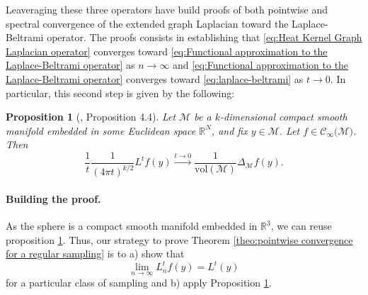 \documentclass{article} %
\newtheorem{definition}{Definition}[section]
\newtheorem{prop}{Proposition}
\renewcommand{\b}[1]{{\bm{#1}}}   %
\begin{document}
Leaveraging these three operators \cite{belkin2005towards, belkin2007convergence} have build proofs of both pointwise and spectral convergence of the extended graph Laplacian toward the Laplace-Beltrami operator.
The proofs consists in establishing that \eqref{eq:Heat Kernel Graph Laplacian operator} converges toward \eqref{eq:Functional approximation to the Laplace-Beltrami operator} as $n\rightarrow \infty$ and \eqref{eq:Functional approximation to the Laplace-Beltrami operator} converges toward \eqref{eq:laplace-beltrami} as $t\rightarrow 0$. In particular, this second step is given by the following:
\begin{prop}
[\cite{belkin2005towards}, Proposition 4.4]
Let $\mathcal{M}$ be a $k$-dimensional compact smooth manifold embedded in some Euclidean space $\mathbb{R}^N$, and fix $y\in\mathcal{M}$. Let $f\in\mathcal{C}_\infty(\mathcal{M)}$. Then
\begin{equation}
\frac{1}{t}\frac{1}{(4\pi t)^{k/2}} L^tf(y) \xrightarrow{t\to 0 } \frac{1}{\text{vol}(\mathcal M)}\Delta_{\mathcal M}f(y).    
\end{equation}
\label{prop:3}
\end{prop}

\paragraph{Building the proof.}
As the sphere is a compact smooth manifold embedded in $\mathbb{R}^3$, we can reuse proposition \ref{prop:3}. Thus, our strategy to prove Theorem \ref{theo:pointwise convergence for a regular sampling} is to a) show that 
\begin{equation}\label{eq:continuous convergence}
 \lim_{n\to\infty}L_n^{t} f(y) =  L^t(y)
\end{equation}
for a particular class of sampling and b) apply Proposition \ref{prop:3}.



\end{document}
